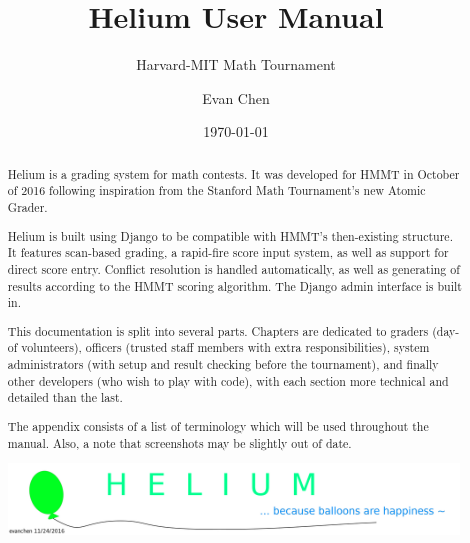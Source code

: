 \documentclass[11pt]{scrreprt}
\begin{document}
\title{Helium User Manual}
\subtitle{Harvard-MIT Math Tournament}
\author{Evan Chen}
\date{\today}
\maketitle

\begin{abstract}
	Helium is a grading system for math contests.
	It was developed for HMMT in October of 2016 following inspiration
	from the Stanford Math Tournament's new Atomic Grader.

	Helium is built using Django to be compatible with
	HMMT's then-existing structure.
	It features scan-based grading, a rapid-fire score input system,
	as well as support for direct score entry.
	Conflict resolution is handled automatically,
	as well as generating of results according to the
	HMMT scoring algorithm.
	The Django admin interface is built in.

	This documentation is split into several parts.
	Chapters are dedicated to graders (day-of volunteers),
	officers (trusted staff members with extra responsibilities),
	system administrators (with setup and result checking before the tournament),
	and finally other developers (who wish to play with code),
	with each section more technical and detailed than the last.

	The appendix consists of a list of terminology which
	will be used throughout the manual.
	Also, a note that screenshots may be slightly out of date.

	\begin{center}
		\includegraphics[width=0.99\textwidth]{../img/balloons.png}
	\end{center}
\end{abstract}

\tableofcontents






\appendix


\end{document}
